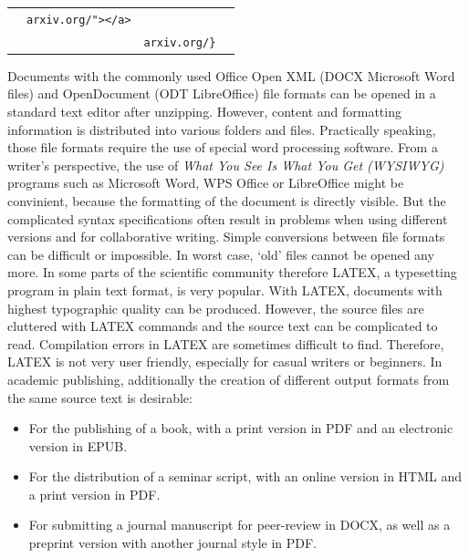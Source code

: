 \documentclass[10pt,fleqn]{wlpeerj}
\providecommand{\tightlist}{%
  \setlength{\itemsep}{0pt}\setlength{\parskip}{0pt}}
\begin{document}
\begin{longtable}[]{@{}llll@{}}
\begin{minipage}[t]{0.25\columnwidth}
\strut\end{minipage}
&
\begin{minipage}[t]{0.27\columnwidth}\raggedright\strut
\texttt{arxiv.org/"\textgreater{}\textless{}/a\textgreater{}}
\strut\end{minipage}\tabularnewline
\begin{minipage}[t]{0.20\columnwidth}\raggedright\strut
\strut\end{minipage}
&
\begin{minipage}[t]{0.17\columnwidth}\raggedright\strut
\strut\end{minipage}
&
\begin{minipage}[t]{0.25\columnwidth}\raggedright\strut
\texttt{arxiv.org/\}}
\strut\end{minipage}
&
\begin{minipage}[t]{0.27\columnwidth}\raggedright\strut
\strut\end{minipage}\tabularnewline
\bottomrule
\end{longtable}

Documents
with
the
commonly
used
Office
Open
XML
(DOCX
Microsoft
Word
files)
and
OpenDocument
(ODT
LibreOffice)
file
formats
can
be
opened
in a
standard
text
editor
after
unzipping.
However,
content
and
formatting
information
is
distributed
into
various
folders
and
files.
Practically
speaking,
those
file
formats
require
the
use
of
special
word
processing
software.
From
a
writer's
perspective,
the
use
of
\emph{What
You
See
Is
What
You
Get
(WYSIWYG)}
programs
such
as
Microsoft
Word,
WPS
Office
or
LibreOffice
might
be
convinient,
because
the
formatting
of
the
document
is
directly
visible.
But
the
complicated
syntax
specifications
often
result
in
problems
when
using
different
versions
and
for
collaborative
writing.
Simple
conversions
between
file
formats
can
be
difficult
or
impossible.
In
worst
case,
`old'
files
cannot
be
opened
any
more.
In
some
parts
of
the
scientific
community
therefore
LATEX,
a
typesetting
program
in
plain
text
format,
is
very
popular.
With
LATEX,
documents
with
highest
typographic
quality
can
be
produced.
However,
the
source
files
are
cluttered
with
LATEX
commands
and
the
source
text
can
be
complicated
to
read.
Compilation
errors
in
LATEX
are
sometimes
difficult
to
find.
Therefore,
LATEX
is
not
very
user
friendly,
especially
for
casual
writers
or
beginners.
In
academic
publishing,
additionally
the
creation
of
different
output
formats
from
the
same
source
text
is
desirable:

\begin{itemize}
\tightlist
\item
  For
  the
  publishing
  of
  a
  book,
  with
  a
  print
  version
  in
  PDF
  and
  an
  electronic
  version
  in
  EPUB.
\item
  For
  the
  distribution
  of
  a
  seminar
  script,
  with
  an
  online
  version
  in
  HTML
  and
  a
  print
  version
  in
  PDF.
\item
  For
  submitting
  a
  journal
  manuscript
  for
  peer-review
  in
  DOCX,
  as
  well
  as
  a
  preprint
  version
  with
  another
  journal
  style
  in
  PDF.
\end{itemize}
\end{document}
